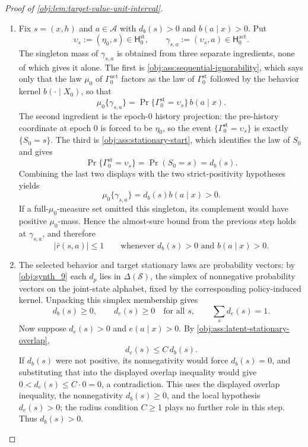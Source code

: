 \begin{proof}[Proof of \cref{obj:lem:target-value-unit-interval}]
\begin{enumerate}
\item Fix \(s=(x,h)\) and \(a\in\mathcal A\) with \(d_b(s)>0\) and \(b(a\mid x)>0\). Put
\[
\upsilon_s:=(\eta_0,s)\in\mathsf H^{\mathrm{st}}_0,
\qquad
\gamma_{s,a}:=(\upsilon_s,a)\in\mathsf H^{\mathrm{act}}_0.
\]
The singleton mass of \(\gamma_{s,a}\) is obtained from three separate ingredients, none of which gives it alone. The first is \cref{obj:ass:sequential-ignorability}, which says only that the law \(\mu_0\) of \(\Gamma^{\mathrm{act}}_0\) factors as the law of \(\Gamma^{\mathrm{st}}_0\) followed by the behavior kernel \(b(\cdot\mid X_0)\), so that
\[
\mu_0\{\gamma_{s,a}\}
=
\Pr\{\Gamma^{\mathrm{st}}_0=\upsilon_s\}\,b(a\mid x).
\]
The second ingredient is the epoch-\(0\) history projection: the pre-history coordinate at epoch \(0\) is forced to be \(\eta_0\), so the event \(\{\Gamma^{\mathrm{st}}_0=\upsilon_s\}\) is exactly \(\{S_0=s\}\). The third is \cref{obj:ass:stationary-start}, which identifies the law of \(S_0\) and gives
\[
\Pr\{\Gamma^{\mathrm{st}}_0=\upsilon_s\}=\Pr(S_0=s)=d_b(s).
\]
Combining the last two displays with the two strict-positivity hypotheses yields
\[
\mu_0\{\gamma_{s,a}\}
=
d_b(s)b(a\mid x)>0.
\]
If a full-\(\mu_0\)-measure set omitted this singleton, its complement would have positive \(\mu_0\)-mass. Hence the almost-sure bound from the previous step holds at \(\gamma_{s,a}\), and therefore
\[
|\bar r(s,a)|\le1
\qquad
\text{whenever } d_b(s)>0 \text{ and } b(a\mid x)>0.
\]

\item The selected behavior and target stationary laws are probability vectors: by \cref{obj:synth_9} each \(d_p\) lies in \(\Delta(\mathcal S)\), the simplex of nonnegative probability vectors on the joint-state alphabet, fixed by the corresponding policy-induced kernel. Unpacking this simplex membership gives
\[
d_b(s)\ge0,
\qquad
d_e(s)\ge0
\quad\text{for all }s,
\qquad
\sum_s d_e(s)=1.
\]
Now suppose \(d_e(s)>0\) and \(e(a\mid x)>0\). By \cref{obj:ass:latent-stationary-overlap},
\[
d_e(s)\le C\,d_b(s).
\]
If \(d_b(s)\) were not positive, its nonnegativity would force \(d_b(s)=0\), and substituting that into the displayed overlap inequality would give \(0<d_e(s)\le C\cdot0=0\), a contradiction. This uses the displayed overlap inequality, the nonnegativity \(d_b(s)\ge0\), and the local hypothesis \(d_e(s)>0\); the radius condition \(C\ge1\) plays no further role in this step. Thus \(d_b(s)>0\).


\end{enumerate}
\end{proof}
